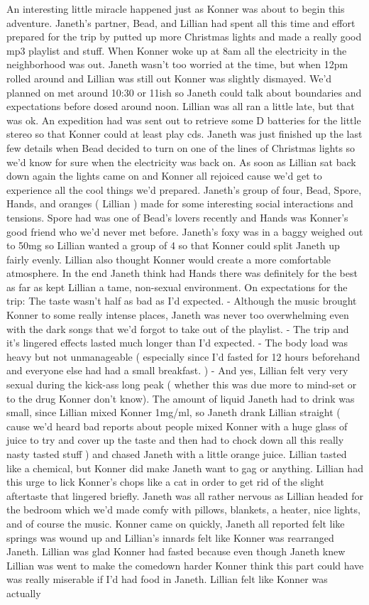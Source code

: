 \documentclass[12pt]{book}
\begin{document}
An interesting little miracle happened just as Konner was about to begin this adventure. Janeth's partner, Bead, and Lillian had spent all this time and effort prepared for the trip by putted up more Christmas lights and made a really good mp3 playlist and stuff. When Konner woke up at 8am all the electricity in the neighborhood was out. Janeth wasn't too worried at the time, but when 12pm rolled around and Lillian was still out Konner was slightly dismayed. We'd planned on met around 10:30 or 11ish so Janeth could talk about boundaries and expectations before dosed around noon. Lillian was all ran a little late, but that was ok. An expedition had was sent out to retrieve some D batteries for the little stereo so that Konner could at least play cds. Janeth was just finished up the last few details when Bead decided to turn on one of the lines of Christmas lights so we'd know for sure when the electricity was back on. As soon as Lillian sat back down again the lights came on and Konner all rejoiced cause we'd get to experience all the cool things we'd prepared. Janeth's group of four, Bead, Spore, Hands, and oranges ( Lillian ) made for some interesting social interactions and tensions. Spore had was one of Bead's lovers recently and Hands was Konner's good friend who we'd never met before. Janeth's foxy was in a baggy weighed out to 50mg so Lillian wanted a group of 4 so that Konner could split Janeth up fairly evenly. Lillian also thought Konner would create a more comfortable atmosphere. In the end Janeth think had Hands there was definitely for the best as far as kept Lillian a tame, non-sexual environment. On expectations for the trip: The taste wasn't half as bad as I'd expected. - Although the music brought Konner to some really intense places, Janeth was never too overwhelming even with the dark songs that we'd forgot to take out of the playlist. - The trip and it's lingered effects lasted much longer than I'd expected. - The body load was heavy but not unmanageable ( especially since I'd fasted for 12 hours beforehand and everyone else had had a small breakfast. ) - And yes, Lillian felt very very sexual during the kick-ass long peak ( whether this was due more to mind-set or to the drug Konner don't know). The amount of liquid Janeth had to drink was small, since Lillian mixed Konner 1mg/ml, so Janeth drank Lillian straight ( cause we'd heard bad reports about people mixed Konner with a huge glass of juice to try and cover up the taste and then had to chock down all this really nasty tasted stuff ) and chased Janeth with a little orange juice. Lillian tasted like a chemical, but Konner did make Janeth want to gag or anything. Lillian had this urge to lick Konner's chops like a cat in order to get rid of the slight aftertaste that lingered briefly. Janeth was all rather nervous as Lillian headed for the bedroom which we'd made comfy with pillows, blankets, a heater, nice lights, and of course the music. Konner came on quickly, Janeth all reported felt like springs was wound up and Lillian's innards felt like Konner was rearranged Janeth. Lillian was glad Konner had fasted because even though Janeth knew Lillian was went to make the comedown harder Konner think this part could have was really miserable if I'd had food in Janeth. Lillian felt like Konner was actually 
\end{document}
